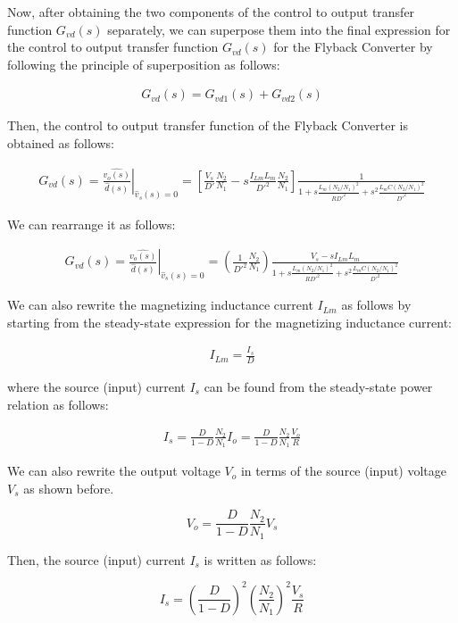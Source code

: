 Now, after obtaining the two components of the control to output transfer function $G_{vd}(s)$ separately, we can superpose them into the final expression for the control to output transfer function $G_{vd}(s)$ for the Flyback Converter by following the principle of superposition as follows:

\begin{align}
    G_{vd}(s) = G_{vd1}(s) + G_{vd2}(s)
\end{align}

Then, the control to output transfer function of the Flyback Converter is obtained as follows:

\begin{align}
   \left. G_{vd}(s) = \frac{\hat{v_o(s)}}{\hat{d}(s)}\right \vert_{\hat{v}_s(s) = 0} = \left[\frac{V_s}{D'}\frac{N_2}{N_1}-s\frac{I_{Lm}L_m}{D'^2}\frac{N_2}{N_1} \right]\frac{1}{1 + s\frac{L_m(N_2/N_1)^2}{RD'^2} + s^2\frac{L_mC(N_2/N_1)^2}{D'^2}}
\end{align}

We can rearrange it as follows:

\begin{align}
   \left. G_{vd}(s) = \frac{\hat{v_o(s)}}{\hat{d}(s)}\right \vert_{\hat{v}_s(s) = 0} = \left(\frac{1}{D'^2}\frac{N_2}{N_1} \right)\frac{V_s - sI_{Lm}L_m}{1 + s\frac{L_m(N_2/N_1)^2}{RD'^2} + s^2\frac{L_mC(N_2/N_1)^2}{D'^2}}
\end{align}

We can also rewrite the magnetizing inductance current $I_{Lm}$ as follows by starting from the steady-state expression for the magnetizing inductance current:

\begin{align}
    I_{Lm} = \frac{I_s}{D}
\end{align}

where the source (input) current $I_s$ can be found from the steady-state power relation as follows:

\begin{align}
    I_s = \frac{D}{1-D}\frac{N_2}{N_1}I_o =  \frac{D}{1-D}\frac{N_2}{N_1}\frac{V_o}{R}
\end{align}

We can also rewrite the output voltage $V_o$ in terms of the source (input) voltage $V_s$ as shown before.

$$ V_o = \frac{D}{1-D}\frac{N_2}{N_1}V_s $$

Then, the source (input) current $I_s$ is written as follows:

$$ I_s = \left(\frac{D}{1-D} \right)^2\left(\frac{N_2}{N_1} \right)^2\frac{V_s}{R} $$

